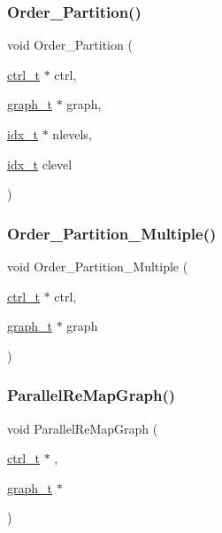 \subsubsection{\texorpdfstring{Order\+\_\+\+Partition()}{Order\_Partition()}}
{\footnotesize\ttfamily void Order\+\_\+\+Partition (\begin{DoxyParamCaption}\item[{\hyperlink{a00742}{ctrl\+\_\+t} $\ast$}]{ctrl,  }\item[{\hyperlink{a00734}{graph\+\_\+t} $\ast$}]{graph,  }\item[{\hyperlink{a00876_aaa5262be3e700770163401acb0150f52}{idx\+\_\+t} $\ast$}]{nlevels,  }\item[{\hyperlink{a00876_aaa5262be3e700770163401acb0150f52}{idx\+\_\+t}}]{clevel }\end{DoxyParamCaption})}

\mbox{\label{a00951_afb769074d2b797e49ea00c9de0ce5314}} 
\subsubsection{\texorpdfstring{Order\+\_\+\+Partition\+\_\+\+Multiple()}{Order\_Partition\_Multiple()}}
{\footnotesize\ttfamily void Order\+\_\+\+Partition\+\_\+\+Multiple (\begin{DoxyParamCaption}\item[{\hyperlink{a00742}{ctrl\+\_\+t} $\ast$}]{ctrl,  }\item[{\hyperlink{a00734}{graph\+\_\+t} $\ast$}]{graph }\end{DoxyParamCaption})}

\mbox{\label{a00951_a1a048af593fd6cf379b6e596ca895589}} 
\subsubsection{\texorpdfstring{Parallel\+Re\+Map\+Graph()}{ParallelReMapGraph()}}
{\footnotesize\ttfamily void Parallel\+Re\+Map\+Graph (\begin{DoxyParamCaption}\item[{\hyperlink{a00742}{ctrl\+\_\+t} $\ast$}]{,  }\item[{\hyperlink{a00734}{graph\+\_\+t} $\ast$}]{ }\end{DoxyParamCaption})}

